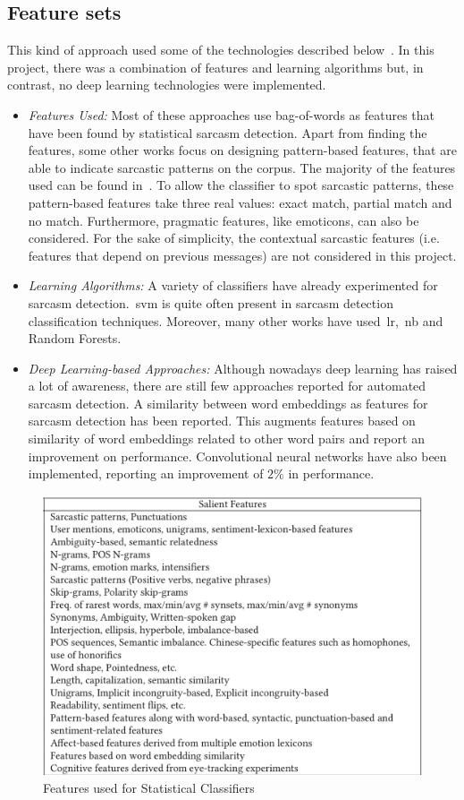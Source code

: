 \subsection{Feature sets}
This kind of approach used some of the technologies described below~\cite{joshi2017automatic}. In this project, there was a combination of features and learning algorithms but, in contrast, no deep learning technologies were implemented.
\begin{itemize}
	\item \textit{Features Used:} Most of these approaches use bag-of-words as features that have been found by statistical sarcasm detection. Apart from finding the features, some other works focus on designing pattern-based features, that are able to indicate sarcastic patterns on the corpus. The majority of the features used can be found in~. To allow the classifier to spot sarcastic patterns, these pattern-based features take three real values: exact match, partial match and no match. Furthermore, pragmatic features, like emoticons, can also be considered. For the sake of simplicity, the contextual sarcastic features (i.e. features that depend on previous messages) are not considered in this project.
	\item \textit{Learning Algorithms:} A variety of classifiers have already experimented for sarcasm detection.~\acf{svm} is quite often present in sarcasm detection classification techniques. Moreover, many other works have used~\acf{lr},~\acf{nb} and Random Forests.
	\item \textit{Deep Learning-based Approaches:} Although nowadays deep learning has raised a lot of awareness, there are still few approaches reported for automated sarcasm detection. A similarity between word embeddings as features for sarcasm detection has been reported. This augments features based on similarity of word embeddings related to other word pairs and report an improvement on performance. Convolutional neural networks have also been implemented, reporting an improvement of $2\%$ in performance.
\end{itemize}
\begin{figure}
	\centering
	\includegraphics[scale=0.3]{img/features.jpeg}
	\caption{Features used for Statistical Classifiers~\cite{joshi2017automatic}}
	\label{fig:featused}
\end{figure}
